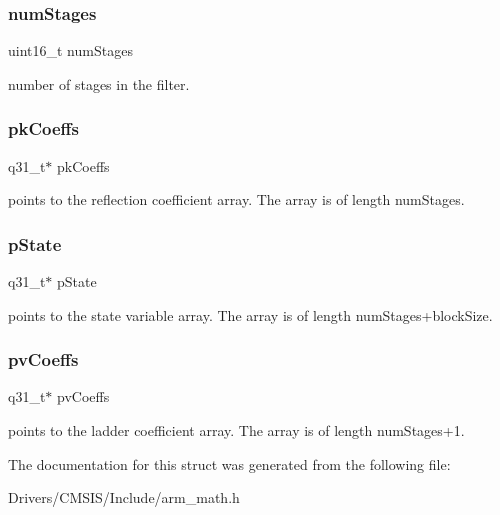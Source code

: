 \subsubsection{\texorpdfstring{num\+Stages}{numStages}}
{\footnotesize\ttfamily uint16\+\_\+t num\+Stages}

number of stages in the filter. \mbox{\label{structarm__iir__lattice__instance__q31_a9d45339bf841bf86aec57be5f70d2b01}} 
\subsubsection{\texorpdfstring{pk\+Coeffs}{pkCoeffs}}
{\footnotesize\ttfamily q31\+\_\+t$\ast$ pk\+Coeffs}

points to the reflection coefficient array. The array is of length num\+Stages. \mbox{\label{structarm__iir__lattice__instance__q31_adee4ba3ee8869865af7d8fa08ca913d6}} 
\subsubsection{\texorpdfstring{p\+State}{pState}}
{\footnotesize\ttfamily q31\+\_\+t$\ast$ p\+State}

points to the state variable array. The array is of length num\+Stages+block\+Size. \mbox{\label{structarm__iir__lattice__instance__q31_a3d7de56fe9de3458f033a64f14407533}} 
\subsubsection{\texorpdfstring{pv\+Coeffs}{pvCoeffs}}
{\footnotesize\ttfamily q31\+\_\+t$\ast$ pv\+Coeffs}

points to the ladder coefficient array. The array is of length num\+Stages+1. 

The documentation for this struct was generated from the following file\+:\begin{DoxyCompactItemize}
\item 
Drivers/\+C\+M\+S\+I\+S/\+Include/arm\+\_\+math.\+h\end{DoxyCompactItemize}
